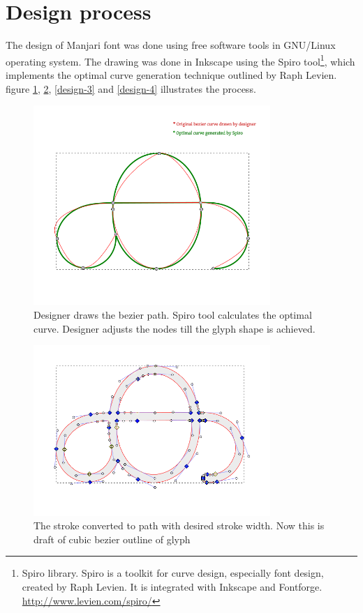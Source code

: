 \documentclass[11pt,twoside,a4paper]{article}
\begin{document}
\section{Design process}

The design of Manjari font was done using free software tools in GNU/Linux operating system. The drawing was done in Inkscape using the Spiro tool\footnote{Spiro library. Spiro is a toolkit for curve design, especially font design, created by Raph Levien. It is integrated with Inkscape and Fontforge. \url{http://www.levien.com/spiro/}}, which implements the optimal curve generation technique outlined by Raph Levien. figure \ref{design-1}, \ref{design-2}, \ref{design-3} and \ref{design-4} illustrates the process.

\begin{figure}[h!]
	\includegraphics[width=0.8\textwidth]{images/design-1-spiral.png}
	\caption{Designer draws the bezier path. Spiro tool calculates the optimal curve. Designer adjusts the nodes till the glyph shape is achieved.}
	\label{design-1}
\end{figure}

\begin{figure}[h!]
	\includegraphics[width=0.8\textwidth]{images/design-2-stroke-to-path.png}
	\caption{The stroke converted to path with desired stroke width. Now this is draft of cubic bezier outline of glyph}
	\label{design-2}
\end{figure}
\end{document}
